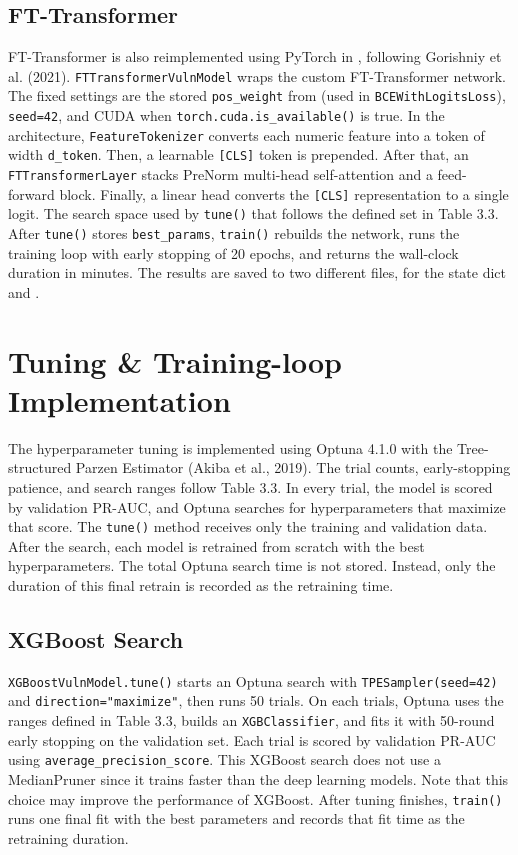 \subsection{FT-Transformer}

FT-Transformer is also reimplemented using PyTorch in , following Gorishniy et al. (2021). \texttt{FTTransformerVulnModel} wraps the custom FT-Transformer network. The fixed settings are the stored \texttt{pos\_weight} from  (used in \texttt{BCEWithLogitsLoss}), \texttt{seed=42}, and CUDA when \texttt{torch.cuda.is\_available()} is true. In the architecture, \texttt{FeatureTokenizer} converts each numeric feature into a token of width \texttt{d\_token}. Then, a learnable \texttt{[CLS]} token is prepended. After that, an \texttt{FTTransformerLayer} stacks PreNorm multi-head self-attention and a feed-forward block. Finally, a linear head converts the \texttt{[CLS]} representation to a single logit. The search space used by \texttt{tune()} that follows the defined set in Table 3.3. After \texttt{tune()} stores \texttt{best\_params}, \texttt{train()} rebuilds the network, runs the training loop with early stopping of 20 epochs, and returns the wall-clock duration in minutes. The results are saved to two different files,  for the state dict and .

\section{Tuning \& Training-loop Implementation}

The hyperparameter tuning is implemented using Optuna 4.1.0 with the Tree-structured Parzen Estimator (Akiba et al., 2019). The trial counts, early-stopping patience, and search ranges follow Table 3.3. In every trial, the model is scored by validation PR-AUC, and Optuna searches for hyperparameters that maximize that score. The \texttt{tune()} method receives only the training and validation data. After the search, each model is retrained from scratch with the best hyperparameters. The total Optuna search time is not stored. Instead, only the duration of this final retrain is recorded as the retraining time.

\subsection{XGBoost Search}

\texttt{XGBoostVulnModel.tune()} starts an Optuna search with \texttt{TPESampler(seed=42)} and \texttt{direction="maximize"}, then runs 50 trials. On each trials, Optuna uses the ranges defined in Table 3.3, builds an \texttt{XGBClassifier}, and fits it with 50-round early stopping on the validation set. Each trial is scored by validation PR-AUC using \texttt{average\_precision\_score}. This XGBoost search does not use a MedianPruner since it trains faster than the deep learning models. Note that this choice may improve the performance of XGBoost. After tuning finishes, \texttt{train()} runs one final fit with the best parameters and records that fit time as the retraining duration.

